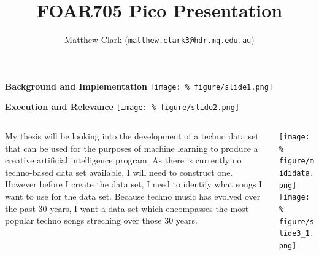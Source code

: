 \documentclass[unknownkeysallowed,usepdftitle=false, parskip=full]{beamer}
\title{FOAR705 Pico Presentation}
\author{Matthew Clark (\texttt{matthew.clark3@hdr.mq.edu.au})}
\institute{Macquarie University, Sydney, NSW}
\newcommand{\secvariable}{nothing}
\newcommand{\mysection}[1]{\renewcommand{\secvariable}{#1}
}
\begin{document}
\mysection{2minutemadness}
\begin{frame}\label{\secvariable}
\begin{center}
    \textbf{Background and Implementation}
    \texttt{[image: \%
figure/slide1.png]}
\end{center}
\end{frame}

\begin{frame}\label{\secvariable}
\begin{center}
\textbf{Execution and Relevance}
    \texttt{[image: \%
figure/slide2.png]}
\end{center}
\end{frame}

\mysection{background}
\begin{frame}\label{\secvariable}
  \begin{columns}[t]
    \begin{column}[c]{0.60\textwidth}
    \parbox{\linewidth}{
    My thesis will be looking into the development of a techno data set that can be used for the purposes of machine learning to produce a creative artificial intelligence program. As there is currently no techno-based data set available, I will need to construct one.\\
	However before I create the data set, I need to identify what songs I want to use for the data set. Because techno music has evolved over the past 30 years, I want a data set which encompasses the most popular techno songs streching over those 30 years.
      }
    \end{column}
    \begin{column}[c]{0.30\textwidth}
\texttt{[image: \%
figure/mididata.png]}\\
\vspace{12pt}
\texttt{[image: \%
figure/slide3\_1.png]}
    \end{column}
  \end{columns}
\end{frame}
\end{document}
